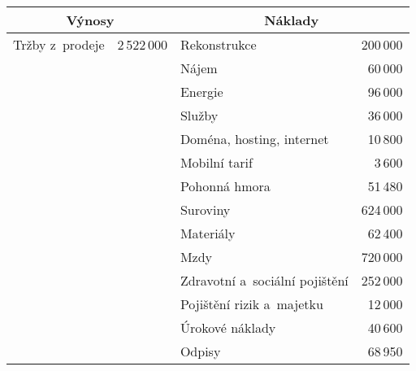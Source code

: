 \begin{table}[htbp]
\begin{center}
\begin{tabular}{lrlr}
\multicolumn{2}{c}{\textbf{Výnosy}\index{výnos}}                    & \multicolumn{2}{c}{\textbf{Náklady\index{náklad}}}                \\ \hline
Tržby z~prodeje        & \multicolumn{1}{r}{2\,522\,000} & Rekonstrukce                   & 200\,000            \\
                       & \multicolumn{1}{r}{}          & Nájem                          & 60\,000             \\
                       &                               & Energie                        & 96\,000             \\
                       &                               & Služby                         & 36\,000             \\
                       &                               & Doména, hosting, internet      & 10\,800             \\
                       &                               & Mobilní tarif                  & 3\,600              \\
                       &                               & Pohonná hmora                  & 51\,480             \\
                       &                               & Suroviny                       & 624\,000            \\
                       &                               & Materiály                      & 62\,400             \\
                       &                               & Mzdy\index{mzda}                           & 720\,000            \\
                       &                               & Zdravotní a~sociální pojištění & 252\,000            \\
                       &                               & Pojištění rizik a~majetku      & 12\,000             \\
                       &                               & Úrokové náklady\index{náklad}                & 40\,600             \\
                       &                               & Odpisy\index{odpis}                         & 68\,950             \\ \hline

\end{tabular}
\end{center}
\end{table}
